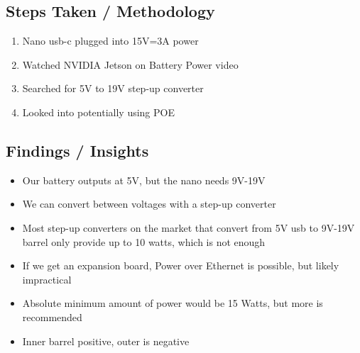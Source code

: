 \subsection*{Steps Taken / Methodology}
\begin{enumerate}
    \item Nano usb-c plugged into 15V=3A power
    \item Watched NVIDIA Jetson on Battery Power video
    \item Searched for 5V to 19V step-up converter
    \item Looked into potentially using POE
\end{enumerate}

\subsection*{Findings / Insights}
\begin{itemize}
    \item Our battery outputs at 5V, but the nano needs 9V-19V
    \item We can convert between voltages with a step-up converter
    \item Most step-up converters on the market that convert from 5V usb to 9V-19V barrel only provide up to 10 watts, which is not enough
    \item If we get an expansion board, Power over Ethernet is possible, but likely impractical
    \item Absolute minimum amount of power would be 15 Watts, but more is recommended
    \item Inner barrel positive, outer is negative
\end{itemize}

